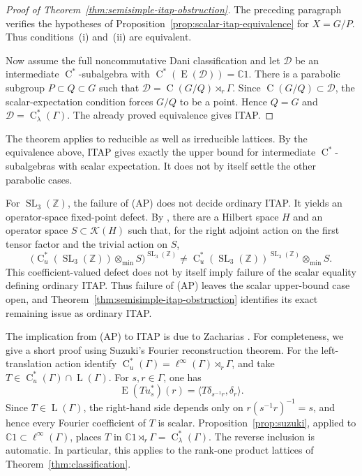 \documentclass[11pt]{amsart}
\numberwithin{equation}{section}
\newcommand{\C}{\mathbb{C}}
\newcommand{\Z}{\mathbb{Z}}
\newcommand{\SL}{\operatorname{SL}}
\newcommand{\rL}{\operatorname{L}}
\newcommand{\rC}{\operatorname{C}}
\newcommand{\rE}{\operatorname{E}}
\theoremstyle{definition}
\begin{document}
	\begin{proof}[Proof of Theorem~\ref{thm:semisimple-itap-obstruction}]
		The preceding paragraph verifies the hypotheses of
		Proposition~\ref{prop:scalar-itap-equivalence} for \(X=G/P\). Thus
		conditions~{\rm (i)} and~{\rm (ii)} are equivalent.
		
		Now assume the full noncommutative Dani classification and let \(\mathcal D\)
		be an intermediate \(\rC^*\)-subalgebra with \(\rC^*(\rE(\mathcal D))=\C1\). There is a
		parabolic subgroup \(P\subset Q\subset G\) such that
		\(\mathcal D=\rC(G/Q)\rtimes_r\Gamma\). Since
		\(\rC(G/Q)\subset\mathcal D\), the scalar-expectation condition forces \(G/Q\)
		to be a point. Hence \(Q=G\) and
		\(\mathcal D=\rC^*_{\lambda}(\Gamma)\). The already proved equivalence gives
		{\rm ITAP}.
	\end{proof}
	
	The theorem applies to reducible as well as irreducible lattices. By the
	equivalence above, {\rm ITAP} gives exactly the upper bound for intermediate
	\(\rC^*\)-subalgebras with scalar expectation. It does not by itself settle the
	other parabolic cases.
	
	For \(\SL_3(\Z)\), the failure of {\rm(AP)} \cite[Theorem~C]{LdlS11} does not decide ordinary {\rm ITAP}. It yields an operator-space fixed-point defect. By \cite[Corollary~1.8]{KU14}, there are a Hilbert space \(H\) and an operator space \(S\subset\mathcal K(H)\) such that, for the right adjoint action on the first tensor factor and the trivial action on \(S\),
	\[
	\bigl(\rC_u^*(\SL_3(\Z))\otimes_{\min} S\bigr)^{\SL_3(\Z)}
	\neq
	\rC_u^*(\SL_3(\Z))^{\SL_3(\Z)}\otimes_{\min} S.
	\]
	This coefficient-valued defect does not by itself imply failure of the scalar
	equality defining ordinary {\rm ITAP}. Thus failure of {\rm(AP)} leaves the scalar
	upper-bound case open, and Theorem~\ref{thm:semisimple-itap-obstruction} identifies its
	exact remaining issue as ordinary {\rm ITAP}.
	
	The implication from {\rm(AP)} to {\rm ITAP} is due to Zacharias
	\cite[Theorem~3.2]{Za06}. For completeness, we give a short proof using Suzuki's
	Fourier reconstruction theorem. For the left-translation action identify
	\(\rC_u^*(\Gamma)=\ell^\infty(\Gamma)\rtimes_r\Gamma\), and take
	\(T\in\rC_u^*(\Gamma)\cap\rL(\Gamma)\). For \(s,r\in\Gamma\), one has
	\[
	\rE(Tu_s^*)(r)=\langle T\delta_{s^{-1}r},\delta_r\rangle.
	\]
	Since
	\(T\in\rL(\Gamma)\), the right-hand side depends only on
	\(r(s^{-1}r)^{-1}=s\), and hence every Fourier coefficient of \(T\) is scalar.
	Proposition~\ref{prop:suzuki}, applied to
	\(\C1\subset\ell^\infty(\Gamma)\), places \(T\) in
	\(\C1\rtimes_r\Gamma=\rC^*_{\lambda}(\Gamma)\). The reverse inclusion is
	automatic. In particular, this applies to the rank-one product lattices of
	Theorem~\ref{thm:classification}.
	
\end{document}

